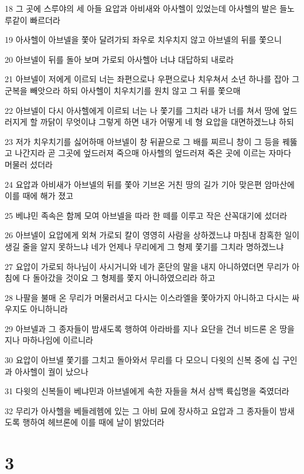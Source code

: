 \par 18 그 곳에 스루야의 세 아들 요압과 아비새와 아사헬이 있었는데 아사헬의 발은 들노루같이 빠르더라
\par 19 아사헬이 아브넬을 쫓아 달려가되 좌우로 치우치지 않고 아브넬의 뒤를 쫓으니
\par 20 아브넬이 뒤를 돌아 보며 가로되 아사헬아 너냐 대답하되 내로라
\par 21 아브넬이 저에게 이르되 너는 좌편으로나 우편으로나 치우쳐서 소년 하나를 잡아 그 군복을 빼앗으라 하되 아사헬이 치우치기를 원치 않고 그 뒤를 쫓으매
\par 22 아브넬이 다시 아사헬에게 이르되 너는 나 쫓기를 그치라 내가 너를 쳐서 땅에 엎드러지게 할 까닭이 무엇이냐 그렇게 하면 내가 어떻게 네 형 요압을 대면하겠느냐 하되
\par 23 저가 치우치기를 싫어하매 아브넬이 창 뒤끝으로 그 배를 찌르니 창이 그 등을 꿰뚫고 나간지라 곧 그곳에 엎드러져 죽으매 아사헬의 엎드러져 죽은 곳에 이르는 자마다 머물러 섰더라
\par 24 요압과 아비새가 아브넬의 뒤를 쫓아 기브온 거친 땅의 길가 기아 맞은편 암마산에 이를 때에 해가 졌고
\par 25 베냐민 족속은 함께 모여 아브넬을 따라 한 떼를 이루고 작은 산꼭대기에 섰더라
\par 26 아브넬이 요압에게 외쳐 가로되 칼이 영영히 사람을 상하겠느냐 마침내 참혹한 일이 생길 줄을 알지 못하느냐 네가 언제나 무리에게 그 형제 쫓기를 그치라 명하겠느냐
\par 27 요압이 가로되 하나님이 사시거니와 네가 혼단의 말을 내지 아니하였더면 무리가 아침에 다 돌아갔을 것이요 그 형제를 쫓지 아니하였으리라 하고
\par 28 나팔을 불매 온 무리가 머물러서고 다시는 이스라엘을 쫓아가지 아니하고 다시는 싸우지도 아니하니라
\par 29 아브넬과 그 종자들이 밤새도록 행하여 아라바를 지나 요단을 건너 비드론 온 땅을 지나 마하나임에 이르니라
\par 30 요압이 아브넬 쫓기를 그치고 돌아와서 무리를 다 모으니 다윗의 신복 중에 십 구인과 아사헬이 궐이 났으나
\par 31 다윗의 신복들이 베냐민과 아브넬에게 속한 자들을 쳐서 삼백 륙십명을 죽였더라
\par 32 무리가 아사헬을 베들레헴에 있는 그 아비 묘에 장사하고 요압과 그 종자들이 밤새도록 행하여 헤브론에 이를 때에 날이 밝았더라

\chapter{3}

